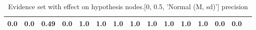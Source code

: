 \begin{table}
\begin{tabular}{c|cc|cc|cc|cc|cc|cc|cc}
\cellcolor{Bittersweet}0.0&\cellcolor{Bittersweet}0.0&\cellcolor{Bittersweet}0.49&\cellcolor{Bittersweet}0.0&\cellcolor{Bittersweet}1.0&\cellcolor{Bittersweet}1.0&\cellcolor{Bittersweet}1.0&\cellcolor{Bittersweet}1.0&\cellcolor{Bittersweet}1.0&\cellcolor{Bittersweet}1.0&\cellcolor{Bittersweet}1.0&\cellcolor{Bittersweet}1.0&\cellcolor{Bittersweet}0.0&\cellcolor{Bittersweet}0.0\\\bottomrule\end{tabular}\caption{Evidence set with effect on hypothesis nodes.[0, 0.5, 'Normal (M, sd)'] precision}\end{table}